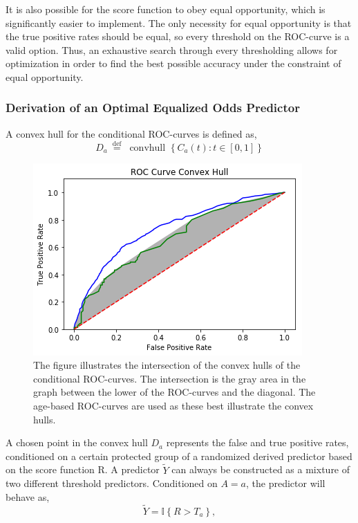 \documentclass[11pt, fleqn, titlepage]{article}
\begin{document}
	It is also possible for the score function to obey equal opportunity, which is significantly easier to implement. The only necessity for equal opportunity is that the true positive rates should be equal, so every threshold on the ROC-curve is a valid option. Thus, an exhaustive search through every thresholding allows for optimization in order to find the best possible accuracy under the constraint of equal opportunity.
	
	\subsubsection{Derivation of an Optimal Equalized Odds Predictor} \label{optimalboi}
	A convex hull for the conditional ROC-curves is defined as, 
	\begin{equation*}\label{key}
	D_{a} \stackrel{\text { def }}{=} \text { convhull }\left\{C_{a}(t): t \in[0,1]\right\}
	\end{equation*}

	\begin{figure}[H]
		\centering
		\includegraphics[width=0.5\linewidth]{imgs/convex_hull}
		\caption{The figure illustrates the intersection of the convex hulls of the conditional ROC-curves. The intersection is the gray area in the graph between the lower of the ROC-curves and the diagonal. The age-based ROC-curves are used as these best illustrate the convex hulls.}
		\label{fig:convexhull}
	\end{figure}
	\noindent
	A chosen point in the convex hull $ D_a $ represents the false and true positive rates, conditioned on a certain protected group of a randomized derived predictor based on the score function R. A predictor $ \tilde Y $ can always be constructed as a mixture of two different threshold predictors. Conditioned on $ A=a $, the predictor will behave as, 
	\begin{equation}\label{odds_pred}
	\widetilde{Y}=\mathbb{I}\left\{R>T_{a}\right\},
	\end{equation}
	
\end{document}
